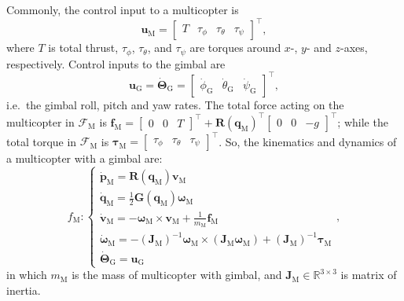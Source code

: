 \documentclass[letterpaper, 10 pt, conference]{ieeeconf}  %
\begin{document}
Commonly, the control input to a multicopter is 
\begin{equation}
\mathbf{u}_\text{M} = \begin{bmatrix} T & \tau_\phi & \tau_\theta & \tau_\psi \end{bmatrix}^\top,
\label{eq:quad_u}
\end{equation}
where $T$ is total thrust, $\tau_\phi$, $\tau_\theta$, and $\tau_\psi$ are torques around $x$-, $y$- and $z$-axes, respectively. Control inputs to the gimbal are
\begin{equation}
\mathbf{u}_\text{G} = \dot{\boldsymbol{\Theta}}_\text{G} = \begin{bmatrix} \dot\phi_\text{G} & \dot\theta_\text{G} & \dot\psi_\text{G} \end{bmatrix}^\top,
\label{eq:gimbal_u}
\end{equation}
i.e.\ the gimbal roll, pitch and yaw rates.
The total force acting on the multicopter in $\mathcal{F}_\text{M}$ is $\mathbf{f}_\text{M} = \begin{bmatrix} 0 & 0 & T \end{bmatrix}^\top + \mathbf{R}\left(\mathbf{q}_\text{M}\right)^\top \begin{bmatrix} 0 & 0 & -g \end{bmatrix}^\top$; while the total torque in $\mathcal{F}_\text{M}$ is $\boldsymbol{\tau}_\text{M} = \begin{bmatrix} \tau_\phi & \tau_\theta & \tau_\psi \end{bmatrix}^\top$.
So, the kinematics and dynamics of a multicopter with a gimbal are:
\begin{equation}
f_\text{M}:
\begin{cases}
\dot{\mathbf{p}}_\text{M} = \mathbf{R}\left(\mathbf{q}_\text{M}\right) \mathbf{v}_\text{M} \\
\dot{\mathbf{q}}_\text{M} = \frac{1}{2} \mathbf{G}\left(\mathbf{q}_\text{M}\right) \boldsymbol{\omega}_\text{M} \\
\dot{\mathbf{v}}_\text{M} = -\boldsymbol{\omega}_\text{M} \times \mathbf{v}_\text{M} + \frac{1}{m_\text{M}} \mathbf{f}_\text{M} \\
\dot{\boldsymbol{\omega}}_\text{M} = -\left(\mathbf{J}_\text{M}\right)^{-1} \boldsymbol{\omega}_\text{M} \times (\mathbf{J}_\text{M} \boldsymbol{\omega}_\text{M}) + \left(\mathbf{J}_\text{M}\right)^{-1} \boldsymbol{\tau}_\text{M} \\
\dot{\boldsymbol{\Theta}}_\text{G} = \mathbf{u}_\text{G}
\end{cases},
\label{eq:quad_dynamics}
\end{equation} 
in which $m_\text{M}$ is the mass of multicopter with gimbal, and $\mathbf{J}_\text{M} \in \mathbb{R}^{3 \times 3}$ is matrix of inertia.
\end{document}
